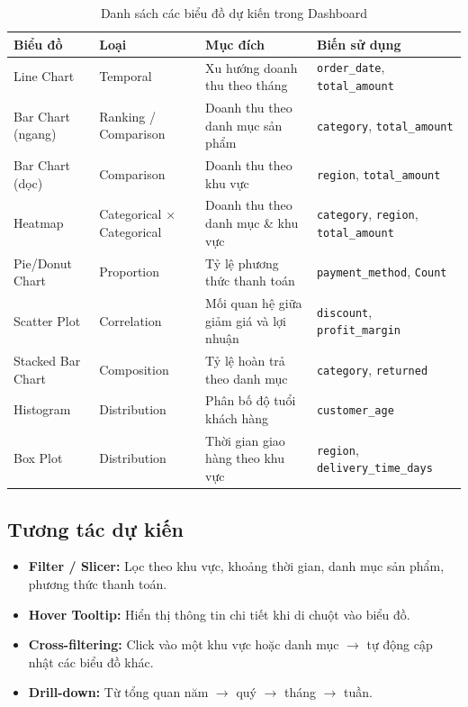 \documentclass[12pt,a4paper]{article}
\begin{document}
\begin{table}[h!]
\centering
\small
\renewcommand{\arraystretch}{1.4}
\begin{tabularx}{\textwidth}{|L{3.2cm}|L{3cm}|X|L{4cm}|}
\hline
\textbf{Biểu đồ} & \textbf{Loại} & \textbf{Mục đích} & \textbf{Biến sử dụng} \\
\hline
Line Chart & Temporal & Xu hướng doanh thu theo tháng & \texttt{order\_date}, \texttt{total\_amount} \\
\hline
Bar Chart (ngang) & Ranking / Comparison & Doanh thu theo danh mục sản phẩm & \texttt{category}, \texttt{total\_amount} \\
\hline
Bar Chart (dọc) & Comparison & Doanh thu theo khu vực & \texttt{region}, \texttt{total\_amount} \\
\hline
Heatmap & Categorical $\times$ Categorical & Doanh thu theo danh mục \& khu vực & \texttt{category}, \texttt{region}, \texttt{total\_amount} \\
\hline
Pie/Donut Chart & Proportion & Tỷ lệ phương thức thanh toán & \texttt{payment\_method}, \texttt{Count} \\
\hline
Scatter Plot & Correlation & Mối quan hệ giữa giảm giá và lợi nhuận & \texttt{discount}, \texttt{profit\_margin} \\
\hline
Stacked Bar Chart & Composition & Tỷ lệ hoàn trả theo danh mục & \texttt{category}, \texttt{returned} \\
\hline
Histogram & Distribution & Phân bố độ tuổi khách hàng & \texttt{customer\_age} \\
\hline
Box Plot & Distribution & Thời gian giao hàng theo khu vực & \texttt{region}, \texttt{delivery\_time\_days} \\
\hline
\end{tabularx}
\caption{Danh sách các biểu đồ dự kiến trong Dashboard}
\end{table}

\subsection{Tương tác dự kiến}

\begin{itemize}[leftmargin=1.5cm]
    \item \textbf{Filter / Slicer:} Lọc theo khu vực, khoảng thời gian, danh mục sản phẩm, phương thức thanh toán.
    \item \textbf{Hover Tooltip:} Hiển thị thông tin chi tiết khi di chuột vào biểu đồ.
    \item \textbf{Cross-filtering:} Click vào một khu vực hoặc danh mục $\rightarrow$ tự động cập nhật các biểu đồ khác.
    \item \textbf{Drill-down:} Từ tổng quan năm $\rightarrow$ quý $\rightarrow$ tháng $\rightarrow$ tuần.
\end{itemize}
\end{document}
